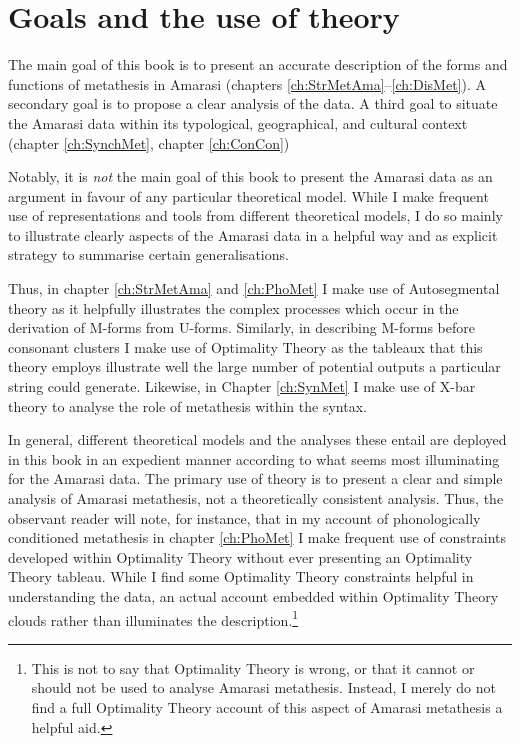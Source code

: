 \section{Goals and the use of theory}\label{sec:GoaUseThe}
The main goal of this book is to present an accurate
description of the forms and functions of metathesis in Amarasi
(chapters \ref{ch:StrMetAma}--\ref{ch:DisMet}).
A secondary goal is to propose a clear analysis of the data.
A third goal to situate the Amarasi data within
its typological, geographical, and cultural context
(chapter \ref{ch:SynchMet}, chapter \ref{ch:ConCon})

Notably, it is \emph{not} the main goal of this book to
present the Amarasi data as an argument in
favour of any particular theoretical model.
While I make frequent use of representations and
tools from different theoretical models,
I do so mainly to illustrate clearly
aspects of the Amarasi data in a helpful way
and as explicit strategy to summarise certain generalisations.

Thus, in chapter \ref{ch:StrMetAma} and \ref{ch:PhoMet}
I make use of Autosegmental theory as it helpfully
illustrates the complex processes which occur in the derivation of M-forms from U-forms.
Similarly, in describing M-forms before consonant clusters
 I make use of Optimality Theory
as the tableaux that this theory employs
illustrate well the large number of potential outputs a particular string could generate.
Likewise, in Chapter \ref{ch:SynMet} I make use of X-bar theory to analyse
the role of metathesis within the syntax.

In general, different theoretical models
and the analyses these entail are deployed in this book
in an expedient manner according to what seems most
illuminating for the Amarasi data.
The primary use of theory is to present a clear and simple
analysis of Amarasi metathesis,
not a theoretically consistent analysis.
Thus, the observant reader will note, for instance,
that in my account of phonologically conditioned metathesis
in chapter \ref{ch:PhoMet} I make frequent use of
constraints developed within Optimality Theory
without ever presenting an Optimality Theory tableau.
While I find some Optimality Theory constraints helpful
in understanding the data, an actual account embedded within Optimality Theory
clouds rather than illuminates the description.\footnote{
		This is not to say that Optimality Theory is wrong,
		or that it cannot or should not be used to analyse Amarasi metathesis.
		Instead, I merely do not find a full Optimality Theory account
		of this aspect of Amarasi metathesis a helpful aid.}

